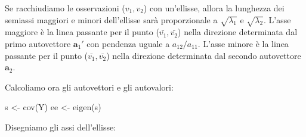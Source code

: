 \documentclass[
  11pt,
]{krantz}
\makeatletter
\newenvironment{Shaded}{\begin{snugshade}}{\end{snugshade}}
\newcommand{\FunctionTok}[1]{\textcolor[rgb]{0,0,0}{#1}}
\newcommand{\NormalTok}[1]{#1}
\newcommand{\OtherTok}[1]{\textcolor[rgb]{0.37,0.37,0.37}{#1}}
\newenvironment{kframe}{%
\medskip{}
\setlength{\fboxsep}{.8em}
 \def\at@end@of@kframe{}%
 \ifinner\ifhmode%
  \def\at@end@of@kframe{\end{minipage}}%
  \begin{minipage}{\columnwidth}%
 \fi\fi%
 \def\FrameCommand##1{\hskip\@totalleftmargin \hskip-\fboxsep
 \colorbox{shadecolor}{##1}\hskip-\fboxsep
     \hskip-\linewidth \hskip-\@totalleftmargin \hskip\columnwidth}%
 \MakeFramed {\advance\hsize-\width
   \@totalleftmargin\z@ \linewidth\hsize
   \@setminipage}}%
 {\par\unskip\endMakeFramed%
 \at@end@of@kframe}
\renewenvironment{Shaded}{\begin{kframe}}{\end{kframe}}
\theoremstyle{definition}
\theoremstyle{definition}
\theoremstyle{definition}
\theoremstyle{definition}
\theoremstyle{remark}
\makeatother
\begin{document}
Se racchiudiamo le osservazioni (\(v_1, v_2\)) con un'ellisse, allora la lunghezza dei semiassi maggiori e minori dell'ellisse sarà proporzionale a \(\sqrt{\lambda_1}\) e \(\sqrt{\lambda_2}\). L'asse maggiore è la linea passante per il punto (\(\bar{v_1}, \bar{v_2}\)) nella direzione determinata dal primo autovettore \(\boldsymbol{a}_1'\) con pendenza uguale a \(a_{12}/a_{11}\). L'asse minore è la linea passante per il punto (\(\bar{v_1}, \bar{v_2}\)) nella direzione determinata dal secondo autovettore \(\boldsymbol{a}_2\).

Calcoliamo ora gli autovettori e gli autovalori:

\begin{Shaded}
\begin{Highlighting}[]
\NormalTok{s }\OtherTok{\textless{}{-}} \FunctionTok{cov}\NormalTok{(Y)}
\NormalTok{ee }\OtherTok{\textless{}{-}} \FunctionTok{eigen}\NormalTok{(s)}
\end{Highlighting}
\end{Shaded}

Disegniamo gli assi dell'ellisse:
\end{document}
